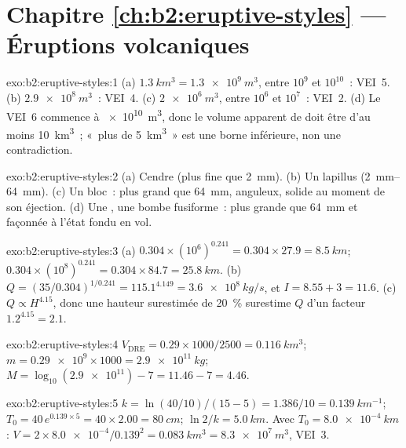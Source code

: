 \section*{Chapitre \ref{ch:b2:eruptive-styles} --- Éruptions volcaniques}

\begin{solution}{exo:b2:eruptive-styles:1}
(a) $\qty{1.3}{km^3} = \qty{1.3e9}{m^3}$, entre $10^9$ et $10^{10}$~: VEI~5.
(b) $\qty{2.9e8}{m^3}$~: VEI~4. (c) $\qty{2e6}{m^3}$, entre $10^6$ et $10^7$~:
VEI~2. (d) Le VEI~6 commence à \qty{e10}{m^3}, donc le volume apparent de  doit être d'au moins
\qty{10}{km^3}~; «~plus de \qty{5}{km^3}~» est une borne inférieure, non une contradiction.
\end{solution}

\begin{solution}{exo:b2:eruptive-styles:2}
(a) Cendre (plus fine que \qty{2}{mm}). (b) Un lapillus (\qtyrange{2}{64}{mm}).
(c) Un bloc~: plus grand que \qty{64}{mm}, anguleux, solide au moment de son éjection. (d) Une
, une bombe fusiforme~: plus grande que \qty{64}{mm} et façonnée à l'état fondu
en vol.
\end{solution}

\begin{solution}{exo:b2:eruptive-styles:3}
(a) $0.304\times(10^6)^{0.241} = 0.304\times27.9 = \qty{8.5}{km}$;
$0.304\times(10^8)^{0.241} = 0.304\times84.7 = \qty{25.8}{km}$.
(b) $Q = (35/0.304)^{1/0.241} = 115.1^{4.149} = \qty{3.6e8}{kg/s}$, et $I =
8.55 + 3 = 11.6$. (c) $Q \propto H^{4.15}$, donc une hauteur surestimée de \qty{20}{\percent} surestime
$Q$ d'un facteur $1.2^{4.15} = 2.1$.
\end{solution}

\begin{solution}{exo:b2:eruptive-styles:4}
$V_{\mathrm{DRE}} = 0.29\times1000/2500 = \qty{0.116}{km^3}$; $m =
\num{0.29e9}\times1000 = \qty{2.9e11}{kg}$; $M = \log_{10}(\num{2.9e11}) - 7 = 11.46
- 7 = 4.46$.
\end{solution}

\begin{solution}{exo:b2:eruptive-styles:5}
$k = \ln(40/10)/(15 - 5) = 1.386/10 = \qty{0.139}{km^{-1}}$; $T_0 = 40\,e^{0.139\times5}
= 40\times2.00 = \qty{80}{cm}$; $\ln2/k = \qty{5.0}{km}$. Avec $T_0 =
\qty{8.0e-4}{km}$: $V = 2\times\num{8.0e-4}/0.139^2 = \qty{0.083}{km^3} =
\qty{8.3e7}{m^3}$, VEI~3.
\end{solution}

